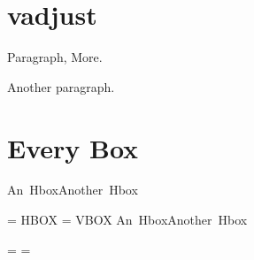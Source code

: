 \documentclass{article}
\begin{document}
\section{vadjust}
Paragraph, More.

Another paragraph.

\section{Every Box}

\def\HBox{ HBOX }
\def\VBox{ VBOX }

\vbox{\hbox{An Hbox}\hbox{Another Hbox}}

\everyhbox={\HBox}
\everyvbox={\VBox}
\vbox{\hbox{An Hbox}\hbox{Another Hbox}}

\everyhbox={}
\everyvbox={}




\end{document}
